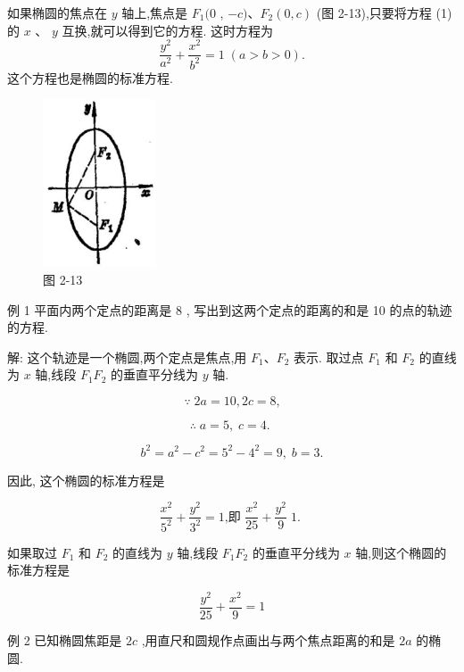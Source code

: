 \documentclass[lang=cn,newtx,10.5pt,scheme=chinese]{elegantbook}
\begin{document}
\begin{corollary}[椭圆的标准方程2]
	

如果椭圆的焦点在 \(y\) 轴上,焦点是 \({F}_{1}(0\) , \(- c)\text{、}{F}_{2}\left( {0,c}\right)\) (图 2-13),只要将方程 (1) 的 \(x\) 、 \(y\) 互换,就可以得到它的方程. 这时方程为
\[
  \frac{{y}^{2}}{{a}^{2}} + \frac{{x}^{2}}{{b}^{2}} = 1\;\left( {a > b > 0}\right) .
\]
这个方程也是椭圆的标准方程.

\end{corollary}

\begin{figure}[h]
  \centering
  \includegraphics[max width=0.3\textwidth]{images/01912cc2-ffb6-728e-9ae7-b113ff05c64b_88_686468.jpg}
  \caption{图 2-13}
\end{figure}




例 1 平面内两个定点的距离是 8 , 写出到这两个定点的距离的和是 10 的点的轨迹的方程.

解: 这个轨迹是一个椭圆,两个定点是焦点,用 \({F}_{1}\text{、}{F}_{2}\) 表示. 取过点 \({F}_{1}\) 和 \({F}_{2}\) 的直线为 \(x\) 轴,线段 \({F}_{1}{F}_{2}\) 的垂直平分线为 \(y\) 轴.

\[
  \because \;{2a} = {10},{2c} = 8\text{,}
\]

\[
  \therefore \;a = 5,\;c = 4\text{. }
\]

\[
    {b}^{2} = {a}^{2} - {c}^{2} = {5}^{2} - {4}^{2} = 9,\;b = 3.
\]

因此, 这个椭圆的标准方程是

\[
  \frac{{x}^{2}}{{5}^{2}} + \frac{{y}^{2}}{{3}^{2}} = 1\text{,即 }\frac{{x}^{2}}{25} + \frac{{y}^{2}}{9}\;1\text{. }
\]

如果取过 \({F}_{1}\) 和 \({F}_{2}\) 的直线为 \(y\) 轴,线段 \({F}_{1}{F}_{2}\) 的垂直平分线为 \(x\) 轴,则这个椭圆的标准方程是

\[
  \frac{{y}^{2}}{25} + \frac{{x}^{2}}{9} = 1
\]

例 2 已知椭圆焦距是 \({2c}\) ,用直尺和圆规作点画出与两个焦点距离的和是 \({2a}\) 的椭圆.
\end{document}
